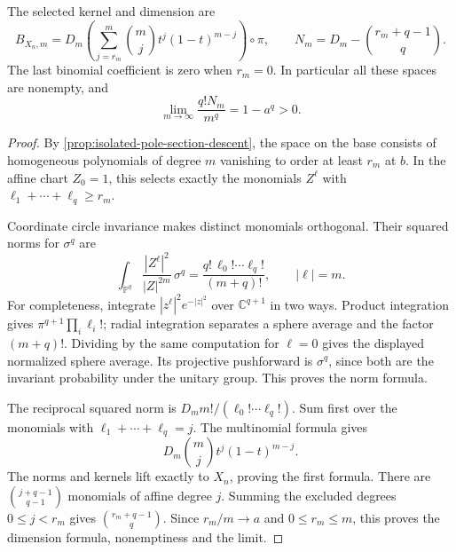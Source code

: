 \begin{proposition}\label{prop:hopf-point-binomial-kernel}
The selected kernel and dimension are
\[
 B_{X_n,m}=D_m\left(
          \sum_{j=r_m}^{m}\binom mj t^j(1-t)^{m-j}\right)\circ\pi,
 \qquad
 N_m=D_m-\binom{r_m+q-1}{q}.
\]
The last binomial coefficient is zero when $r_m=0$. In particular all these spaces are nonempty, and
\[
 \lim_{m\to\infty}\frac{q!N_m}{m^q}=1-a^q>0.
\]
\end{proposition}
\begin{proof}
By \cref{prop:isolated-pole-section-descent}, the space on the base consists of homogeneous polynomials of degree $m$ vanishing to order at least $r_m$ at $b$. In the affine chart $Z_0=1$, this selects exactly the monomials $Z^\ell$ with $\ell_1+\cdots+\ell_q\geq r_m$.

Coordinate circle invariance makes distinct monomials orthogonal. Their squared norms for $\sigma^q$ are
\[
 \int_{\mathbb P^q}\frac{|Z^\ell|^2}{|Z|^{2m}}\,\sigma^q
       =\frac{q!\,\ell_0!\cdots\ell_q!}{(m+q)!},
 \qquad |\ell|=m.
\]
For completeness, integrate $|z^\ell|^2e^{-|z|^2}$ over $\mathbb C^{q+1}$ in two ways. Product integration gives $\pi^{q+1}\prod_i\ell_i!$; radial integration separates a sphere average and the factor $(m+q)!$. Dividing by the same computation for $\ell=0$ gives the displayed normalized sphere average. Its projective pushforward is $\sigma^q$, since both are the invariant probability under the unitary group. This proves the norm formula.

The reciprocal squared norm is $D_m m!/(\ell_0!\cdots\ell_q!)$. Sum first over the monomials with $\ell_1+\cdots+\ell_q=j$. The multinomial formula gives
\[
 D_m\binom mj t^j(1-t)^{m-j}.
\]
The norms and kernels lift exactly to $X_n$, proving the first formula. There are $\binom{j+q-1}{q-1}$ monomials of affine degree $j$. Summing the excluded degrees $0\leq j<r_m$ gives $\binom{r_m+q-1}{q}$. Since $r_m/m\to a$ and $0\leq r_m\leq m$, this proves the dimension formula, nonemptiness and the limit.
\end{proof}

